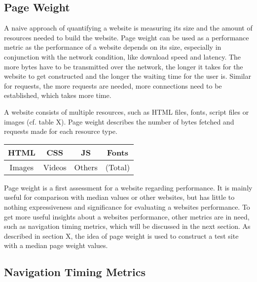 


\subsection{Page Weight}

A naive approach of quantifying a website is measuring its size and the amount of resources needed to build the website.
Page weight can be used as a performance metric as the performance of a website depends on its size, especially in conjunction with the network condition, like download speed and latency.
The more bytes have to be transmitted over the network, the longer it takes for the website to get constructed and the longer the waiting time for the user is.
Similar for requests, the more requests are needed, more connections need to be established, which takes more time.

A website consists of multiple resources, such as HTML files, fonts, script files or images (cf. table X).
Page weight describes the number of bytes fetched and requests made for each resource type. %

\begin{center}
\begin{tabular}{| c | c | c | c | }
\hline
HTML & CSS  & JS & Fonts \\
\hline
Images & Videos & Others & (Total) \\
\hline
\end{tabular}
\end{center}

Page weight is a first assessment for a website regarding performance.
It is mainly useful for comparison with median values or other websites, but has little to nothing expressiveness and significance for evaluating a websites performance.
To get more useful insights about a websites performance, other metrics are in need, such as navigation timing metrics, which will be discussed in the next section.
As described in section X,  the idea of page weight is used to construct a test site with a median page weight values.




\subsection{Navigation Timing Metrics}

